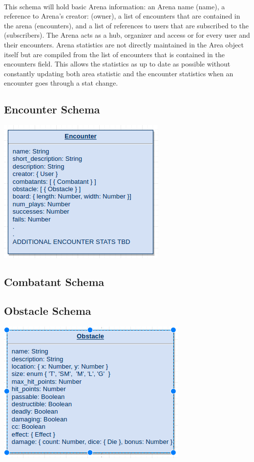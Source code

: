 \documentclass[12pt,a4paper]{report}
\begin{document}
			\paragraph{}This schema will hold basic Arena information: an Arena name (name), a reference to Arena's creator: (owner), a list of encounters that are contained in the arena (encounters), and a list of references to users that are subscribed to the (subscribers). The Arena acts as a hub, organizer and access or for every user and their encounters. Arena statistics are not directly maintained in the Area object itself but are compiled from the list of encounters that is contained in the encounters field. This allows the statistics as up to date as possible without constantly updating both area statistic and the encounter statistics when an encounter goes through a stat change.
		\subsection{Encounter Schema}
			\includegraphics[scale=.75]{schema-encounter}
		\subsection{Combatant Schema}
		\subsection{Obstacle Schema}
			\includegraphics[scale=.75]{schema-obstacle}
\end{document}
